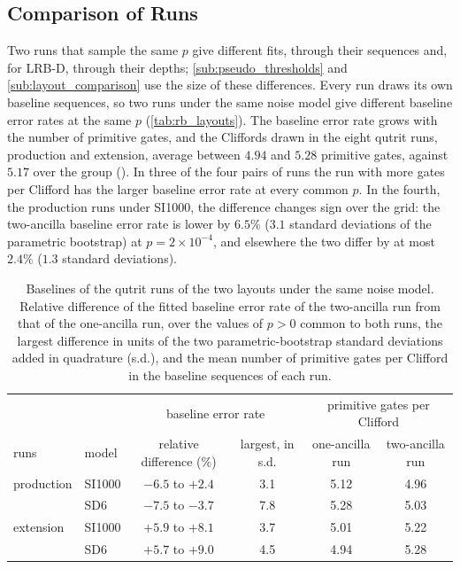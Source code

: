 \subsection{Comparison of Runs}
\label{app:campaign-runs}

Two runs that sample the same $p$ give different fits, through their sequences and, for LRB-D, through their depths; \autoref{sub:pseudo_thresholds} and \autoref{sub:layout_comparison} use the size of these differences. Every run draws its own baseline sequences, so two runs under the same noise model give different baseline error rates at the same $p$ (\autoref{tab:rb_layouts}). The baseline error rate grows with the number of primitive gates, and the Cliffords drawn in the eight qutrit runs, production and extension, average between $4.94$ and $5.28$ primitive gates, against $5.17$ over the group (). In three of the four pairs of runs the run with more gates per Clifford has the larger baseline error rate at every common $p$. In the fourth, the production runs under SI1000, the difference changes sign over the grid: the two-ancilla baseline error rate is lower by $6.5\%$ ($3.1$ standard deviations of the parametric bootstrap) at $p = 2\times10^{-4}$, and elsewhere the two differ by at most $2.4\%$ ($1.3$ standard deviations).

\begin{table}[tp]
  \centering
  \small
  \begin{tabular}{ll|cc|cc}
    \hline
    & & \multicolumn{2}{c|}{baseline error rate} & \multicolumn{2}{c}{primitive gates per Clifford} \\
    runs & model & relative difference (\%) & largest, in s.d. & one-ancilla run & two-ancilla run \\
    \hline
    production & SI1000 & $-6.5$ to $+2.4$ & 3.1 & 5.12 & 4.96 \\
     & SD6 & $-7.5$ to $-3.7$ & 7.8 & 5.28 & 5.03 \\
    extension & SI1000 & $+5.9$ to $+8.1$ & 3.7 & 5.01 & 5.22 \\
     & SD6 & $+5.7$ to $+9.0$ & 4.5 & 4.94 & 5.28 \\
    \hline
  \end{tabular}
  \caption{Baselines of the qutrit runs of the two layouts under the same noise model. Relative difference of the fitted baseline error rate of the two-ancilla run from that of the one-ancilla run, over the values of $p > 0$ common to both runs, the largest difference in units of the two parametric-bootstrap standard deviations added in quadrature (s.d.), and the mean number of primitive gates per Clifford in the baseline sequences of each run.}
  \label{tab:rb_layouts}
\end{table}


